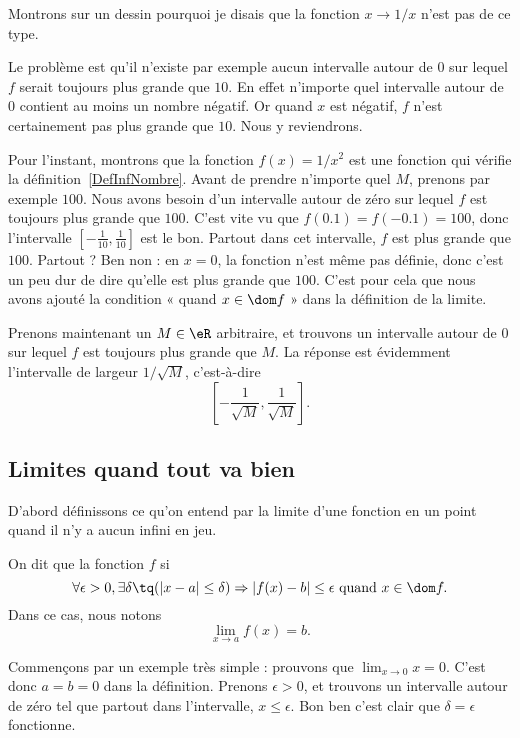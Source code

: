 Montrons sur un dessin pourquoi je disais que la fonction $x\to 1/x$ n'est pas de ce type.


Le problème est qu'il n'existe par exemple aucun intervalle autour de $0$ sur lequel $f$ serait toujours plus grande que $10$. En effet n'importe quel intervalle autour de $0$ contient au moins un nombre négatif. Or quand $x$ est négatif, $f$ n'est certainement pas plus grande que $10$. Nous y reviendrons.

Pour l'instant, montrons que la fonction $f(x)=1/x^2$ est une fonction qui vérifie la définition~\ref{DefInfNombre}.  Avant de prendre n'importe quel $M$, prenons par exemple $100$. Nous avons besoin d'un intervalle autour de zéro sur lequel $f$ est toujours plus grande que $100$. C'est vite vu que $f(0.1)=f(-0.1)=100$, donc l'intervalle $[-\frac{ 1 }{ 10 },\frac{1}{ 10 }]$ est le bon. Partout dans cet intervalle, $f$ est plus grande que $100$. Partout ? Ben non : en $x=0$, la fonction n'est même pas définie, donc c'est un peu dur de dire qu'elle est plus grande que $100$. C'est pour cela que nous avons ajouté la condition « quand $x\in\dom f$ » dans la définition de la limite.

Prenons maintenant un $M\in\eR$ arbitraire, et trouvons un intervalle autour de $0$ sur lequel $f$ est toujours plus grande que $M$. La réponse est évidemment l'intervalle de largeur $1/\sqrt{M}$, c'est-à-dire
\[
  \left[ -\frac{ 1 }{ \sqrt{M} },\frac{ 1 }{ \sqrt{M} } \right].
\]

\subsection{Limites quand tout va bien}

D'abord définissons ce qu'on entend par la limite d'une fonction en un point quand il n'y a aucun infini en jeu.
\begin{definition}      \label{DefLimPointSansInfini}
 On dit que la fonction $f$  si
\[
  \forall \epsilon>0,\exists\delta\tq (| x-a |\leq\delta)\Rightarrow | f(x)-b |\leq \epsilon\text{ quand }x\in\dom f.
\]
Dans ce cas, nous notons
\begin{equation}
\lim_{x\to a}f(x)=b.
\end{equation}
\end{definition}

Commençons par un exemple très simple : prouvons que $\lim_{x\to 0}x=0$. C'est donc $a=b=0$ dans la définition. Prenons $\epsilon>0$, et trouvons un intervalle autour de zéro tel que partout dans l'intervalle, $x\leq \epsilon$. Bon ben c'est clair que $\delta=\epsilon$ fonctionne.

